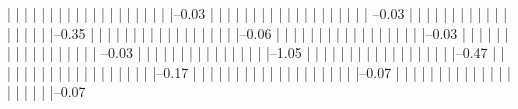             |          |          |          |          |          |          |          |          |          |          
            |          |          |          |          |          |          |          |          |          |--0.03%
            |          |          |          |          |          |          |          |          |          |          
            |          |          |          |          |          |          |          |          |           --0.03%
            |          |          |          |          |          |          |          |          |          
            |          |          |          |          |          |          |          |          |--0.35%
            |          |          |          |          |          |          |          |          |          
            |          |          |          |          |          |          |          |          |--0.06%
            |          |          |          |          |          |          |          |          |          
            |          |          |          |          |          |          |          |          |--0.03%
            |          |          |          |          |          |          |          |          |          
            |          |          |          |          |          |          |          |           --0.03%
            |          |          |          |          |          |          |          |          
            |          |          |          |          |          |          |          |--1.05%
            |          |          |          |          |          |          |          |          |          
            |          |          |          |          |          |          |          |          |--0.47%
            |          |          |          |          |          |          |          |          |          |          
            |          |          |          |          |          |          |          |          |          |--0.17%
            |          |          |          |          |          |          |          |          |          |          
            |          |          |          |          |          |          |          |          |          |--0.07%
            |          |          |          |          |          |          |          |          |          |          
            |          |          |          |          |          |          |          |          |          |--0.07%
